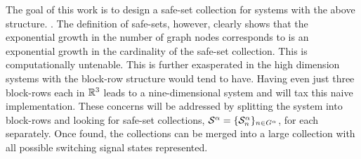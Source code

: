 The goal of this work is to design a safe-set collection for systems with the above structure. . The definition of safe-sets, however, clearly shows that the exponential growth in the number of graph nodes corresponds to is an exponential growth in the cardinality of the safe-set collection. This is computationally untenable. This is further exasperated in the high dimension systems with the block-row structure would tend to have. Having even just three block-rows each in $\mathbb{R}^3$ leads to a nine-dimensional system and will tax this naive implementation. These concerns will be addressed by splitting the system into block-rows and looking for safe-set collections, $\mathcal{S}^{\agentidx}=\{\mathcal{S}^\agentidx_n\}_{n\in\gnumnodes[\agentidx]}$, for each separately. Once found, the collections can be merged into a large collection with all possible switching signal states represented.

